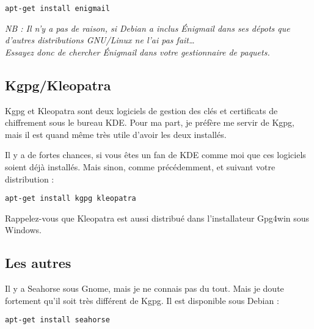 \begin{lstlisting}
apt-get install enigmail
\end{lstlisting}

\emph{NB : Il n'y a pas de raison, si Debian a inclus Énigmail dans ses
dépots que d'autres distributions GNU/Linux ne l'ai pas
fait\ldots{}\\Essayez donc de chercher Énigmail dans votre gestionnaire
de paquets.}

\subsection{Kgpg/Kleopatra}\label{kgpgkleopatra}

Kgpg et Kleopatra sont deux logiciels de gestion des clés et certificats
de chiffrement sous le bureau KDE. Pour ma part, je préfère me servir de
Kgpg, mais il est quand même très utile d'avoir les deux installés.

Il y a de fortes chances, si vous êtes un fan de KDE comme moi que ces
logiciels soient déjà installés. Mais sinon, comme précédemment, et
suivant votre distribution :

\begin{lstlisting}
apt-get install kgpg kleopatra
\end{lstlisting}

Rappelez-vous que Kleopatra est aussi distribué dans l'installateur
Gpg4win sous Windows.

\subsection{Les autres}\label{les-autres-1}

Il y a Seahorse sous Gnome, mais je ne connais pas du tout. Mais je
doute fortement qu'il soit très différent de Kgpg. Il est disponible
sous Debian :

\begin{lstlisting}
apt-get install seahorse
\end{lstlisting}
